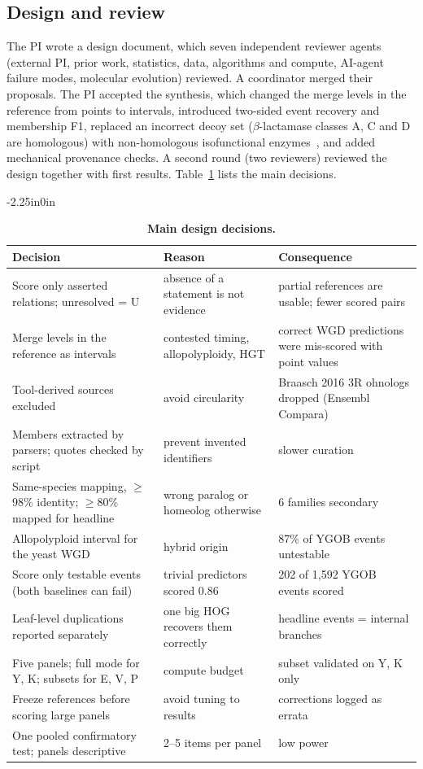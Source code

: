 \subsection*{Design and review}
The PI wrote a design document, which seven independent reviewer agents (external PI, prior work, statistics, data,
algorithms and compute, AI-agent failure modes, molecular evolution) reviewed. A coordinator merged their proposals.
The PI accepted the synthesis, which changed the merge levels in the reference from points to intervals, introduced two-sided
event recovery and membership F1, replaced an incorrect decoy set ($\beta$-lactamase classes A, C and D are
homologous) with non-homologous isofunctional enzymes~\cite{omelchenko2010}, and added mechanical provenance checks.
A second round (two reviewers) reviewed the design together with first results. Table~\ref{tab4} lists the main
decisions.

\begin{table}[!ht]
\begin{adjustwidth}{-2.25in}{0in}
\centering
\caption{{\bf Main design decisions.}}
\small
\begin{tabular}{p{5.2cm}p{6.0cm}p{5.6cm}}
\toprule
Decision & Reason & Consequence \\
\midrule
Score only asserted relations; unresolved = U & absence of a statement is not evidence & partial references are usable; fewer scored pairs \\
Merge levels in the reference as intervals & contested timing, allopolyploidy, HGT & correct WGD predictions were mis-scored with point values \\
Tool-derived sources excluded & avoid circularity & Braasch 2016 3R ohnologs dropped (Ensembl Compara) \\
Members extracted by parsers; quotes checked by script & prevent invented identifiers & slower curation \\
Same-species mapping, $\geq$98\% identity; $\geq$80\% mapped for headline & wrong paralog or homeolog otherwise & 6 families secondary \\
Allopolyploid interval for the yeast WGD & hybrid origin~\cite{marcethouben2015} & 87\% of YGOB events untestable \\
Score only testable events (both baselines can fail) & trivial predictors scored 0.86 & 202 of 1,592 YGOB events scored \\
Leaf-level duplications reported separately & one big HOG recovers them correctly & headline events = internal branches \\
Five panels; full mode for Y, K; subsets for E, V, P & compute budget & subset validated on Y, K only \\
Freeze references before scoring large panels & avoid tuning to results & corrections logged as errata \\
One pooled confirmatory test; panels descriptive & 2--5 items per panel & low power \\
\bottomrule
\end{tabular}
\label{tab4}
\end{adjustwidth}
\end{table}

